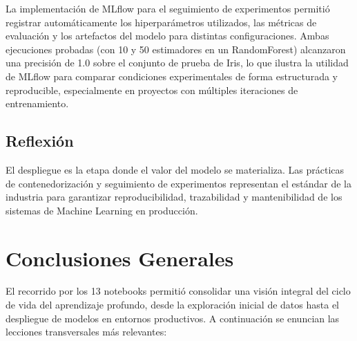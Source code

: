 \documentclass[12pt, a4paper]{article}
\begin{document}
La implementación de MLflow para el seguimiento de experimentos permitió registrar automáticamente los hiperparámetros utilizados, las métricas de evaluación y los artefactos del modelo para distintas configuraciones. Ambas ejecuciones probadas (con 10 y 50 estimadores en un RandomForest) alcanzaron una precisión de 1.0 sobre el conjunto de prueba de Iris, lo que ilustra la utilidad de MLflow para comparar condiciones experimentales de forma estructurada y reproducible, especialmente en proyectos con múltiples iteraciones de entrenamiento.

\subsection{Reflexión}

El despliegue es la etapa donde el valor del modelo se materializa. Las prácticas de contenedorización y seguimiento de experimentos representan el estándar de la industria para garantizar reproducibilidad, trazabilidad y mantenibilidad de los sistemas de Machine Learning en producción.

\section{Conclusiones Generales}

El recorrido por los 13 notebooks permitió consolidar una visión integral del ciclo de vida del aprendizaje profundo, desde la exploración inicial de datos hasta el despliegue de modelos en entornos productivos. A continuación se enuncian las lecciones transversales más relevantes:
\end{document}
